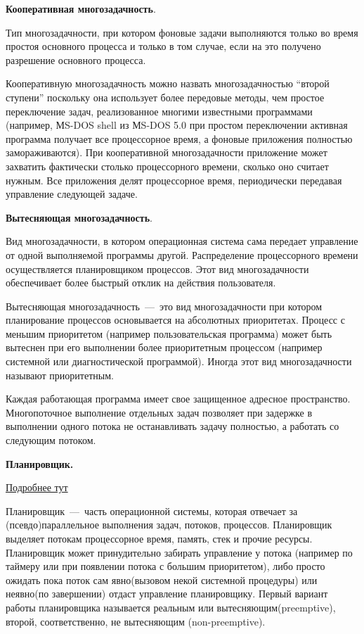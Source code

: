 \documentclass{article}
\begin{document}
\textbf{Кооперативная многозадачность}.

Тип многозадачности, при котором фоновые задачи выполняются только во время простоя основного процесса и только в том случае, если на это получено разрешение основного процесса.

Кооперативную многозадачность можно назвать многозадачностью “второй ступени” поскольку она использует более передовые методы, чем простое переключение задач, реализованное многими известными программами (например, МS-DOS shell из МS-DOS 5.0 при простом переключении активная программа получает все процессорное время, а фоновые приложения полностью замораживаются). При кооперативной многозадачности приложение может захватить фактически столько процессорного времени, сколько оно считает нужным. Все приложения делят процессорное время, периодически передавая управление следующей задаче.

\textbf{ Вытесняющая многозадачность}.

Вид многозадачности, в котором операционная система сама передает управление от одной выполняемой программы другой. Распределение процессорного времени осуществляется планировщиком процессов. Этот вид многозадачности обеспечивает более быстрый отклик на действия пользователя.

Вытесняющая многозадачность~---~это вид многозадачности при котором планирование процессов основывается на абсолютных приоритетах. Процесс с меньшим приоритетом (например пользовательская программа) может быть вытеснен при его выполнении более приоритетным процессом (например системной или диагностической программой). Иногда этот вид многозадачности называют приоритетным.

Каждая работающая программа имеет свое защищенное адресное пространство. Многопоточное выполнение отдельных задач позволяет при задержке в выполнении одного потока не останавливать задачу полностью, а работать со следующим потоком.

\textbf{Планировщик.}

\href{https://habr.com/ru/post/154609/}{Подробнее тут}

Планировщик~---~часть операционной системы, которая отвечает за (псевдо)параллельное выполнения задач, потоков, процессов. Планировщик выделяет потокам процессорное время, память, стек и прочие ресурсы. Планировщик может принудительно забирать управление у потока (например по таймеру или при появлении потока с большим приоритетом), либо просто ожидать пока поток сам явно(вызовом некой системной процедуры) или неявно(по завершении) отдаст управление планировщику.
Первый вариант работы планировщика называется реальным или вытесняющим(preemptive), второй, соответственно, не вытесняющим (non-preemptive).
\end{document}
